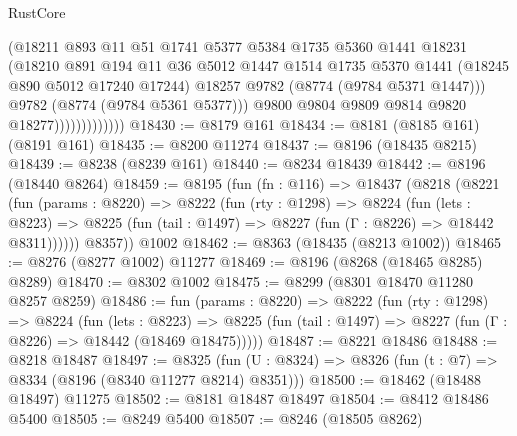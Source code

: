 \begin{lexlean}{RustCore}
\begin{coremodule}
                              (@18211
                                @893
                                @11
                                @51
                                @1741
                                @5377
                                @5384
                                @1735
                                @5360
                                @1441
                                @18231
                                (@18210
                                  @891
                                  @194
                                  @11
                                  @36
                                  @5012
                                  @1447
                                  @1514
                                  @1735
                                  @5370
                                  @1441
                                  (@18245 @890 @5012 @17240 @17244)
                                  @18257
                                  @9782
                                  (@8774 (@9784 @5371 @1447)))
                                @9782
                                (@8774 (@9784 @5361 @5377)))
                              @9800
                              @9804
                              @9809
                              @9814
                              @9820
                              @18277)))))))))))))
@18430 := @8179 @161
@18434 := @8181 (@8185 @161) (@8191 @161)
@18435 := @8200 @11274
@18437 := @8196 (@18435 @8215)
@18439 := @8238 (@8239 @161)
@18440 := @8234 @18439
@18442 := @8196 (@18440 @8264)
@18459 := @8195
    (fun (fn : @116) =>
    @18437
      (@8218
        (@8221
          (fun (params : @8220) =>
          @8222
            (fun (rty : @1298) =>
            @8224
              (fun (lets : @8223) =>
              @8225 (fun (tail : @1497) => @8227 (fun (Γ : @8226) => @18442 @8311))))))
        @8357))
    @1002
@18462 := @8363 (@18435 (@8213 @1002))
@18465 := @8276 (@8277 @1002) @11277
@18469 := @8196 (@8268 (@18465 @8285) @8289)
@18470 := @8302 @1002
@18475 := @8299 (@8301 @18470 @11280 @8257 @8259)
@18486 := fun (params : @8220) =>
  @8222
    (fun (rty : @1298) =>
    @8224
      (fun (lets : @8223) =>
      @8225 (fun (tail : @1497) => @8227 (fun (Γ : @8226) => @18442 (@18469 @18475)))))
@18487 := @8221 @18486
@18488 := @8218 @18487
@18497 := @8325
    (fun (U : @8324) => @8326 (fun (t : @7) => @8334 (@8196 (@8340 @11277 @8214) @8351)))
@18500 := @18462 (@18488 @18497) @11275
@18502 := @8181 @18487 @18497
@18504 := @8412 @18486 @5400
@18505 := @8249 @5400
@18507 := @8246 (@18505 @8262)

\end{coremodule}
\end{lexlean}
